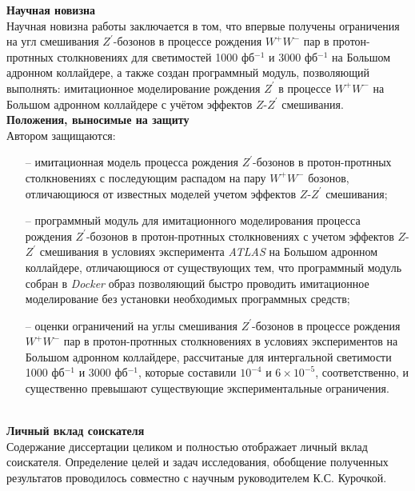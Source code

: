 \textbf{Научная новизна}\\

Научная новизна работы заключается в том, что впервые получены ограничения на угл смешивания ${Z}^{\prime}$-бозонов в
процессе рождения ${W}^{+}$${W}^{-}$ пар в протон-протнных столкновениях для светимостей 1000 фб${}^{−1}$ и 3000 фб${}^{−1}$ на Большом адронном коллайдере, а также создан программный модуль, позволяющий выполнять: имитационное моделирование рождения ${Z}^{\prime}$ в процессе ${W}^{+}{W}^{-}$
на Большом адронном коллайдере с учётом эффектов $Z$-${Z}^{\prime}$ смешивания.
\\

\textbf{Положения, выносимые на защиту}\\

Автором защищаются:
\begin{itemize}
	\item[--] имитационная модель процесса рождения ${Z}^{\prime}$-бозонов в протон-протнных столкновениях с последующим распадом на пару ${W}^{+}{W}^{-}$ бозонов, отличающиюся от известных моделей учетом эффектов $Z$-${Z}^{\prime}$ смешивания;
	
	\item[--] программный модуль для имитационного моделирования процесса
	рождения ${Z}^{\prime}$-бозонов в протон-протнных столкновениях с учетом эффектов $Z$-${Z}^{\prime}$ смешивания в условиях эксперимента \textit{ATLAS} на Большом адронном коллайдере, отличающиюся от существующих тем, что программный модуль собран в \textit{Docker} образ позволяющий быстро проводить имитационное моделирование без установки необходимых программных средств;
	
	\item[--] оценки ограничений на углы смешивания ${Z}^{\prime}$-бозонов в
	процессе рождения ${W}^{+}$${W}^{-}$ пар в протон-протнных столкновениях
	в условиях экспериментов на Большом адронном коллайдере, рассчитаные для интергальной светимости 1000 фб${}^{−1}$ и 3000 фб${}^{−1}$, которые составили  ${10}^{-4}$ и $6\times{10}^{-5}$, соответственно, и существенно превышают существующие экспериментальные ограничения.
	
\end{itemize}
\\

\textbf{Личный вклад соискателя}\\

Содержание диссертации целиком и полностью отображает личный вклад соискателя. Определение целей и задач исследования, обобщение полученных результатов проводилось совместно с научным руководителем К.С. Курочкой.

